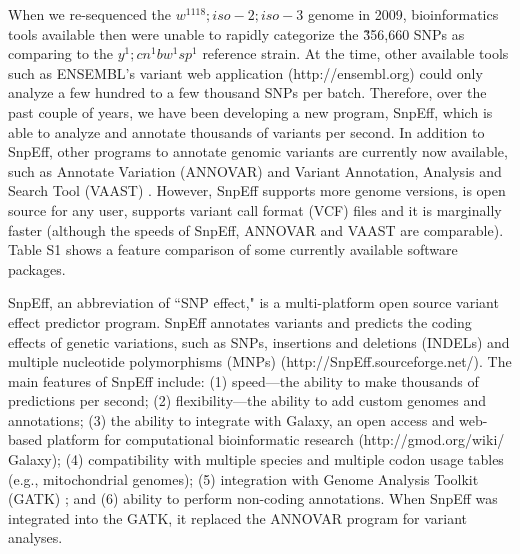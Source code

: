 When we re-sequenced the $w^{1118} ; iso-2; iso-3$ genome in 2009, \cite{platts2009massively} bioinformatics tools available then were unable to rapidly categorize the \~356,660 SNPs as comparing to the $y^1 ; cn^1 bw^1 sp^1$ reference strain. At the time, other available tools such as ENSEMBL’s variant web application (http://ensembl.org) could only analyze a few hundred to a few thousand SNPs per batch. Therefore, over the past couple of years, we have been developing a new program, SnpEff, which is able to analyze and annotate thousands of variants per second. In addition to SnpEff, other programs to annotate genomic variants are currently now available, such as Annotate Variation (ANNOVAR) \cite{wang2010annovar} and Variant Annotation, Analysis and Search Tool (VAAST) \cite{rope2011using}. However, SnpEff supports more genome versions, is open source for any user, supports variant call format (VCF) files and it is marginally faster (although the speeds of SnpEff, ANNOVAR and VAAST are comparable). Table S1 shows a feature comparison of some currently available software packages.

SnpEff, an abbreviation of ``SNP effect," is a multi-platform open source variant effect predictor program. SnpEff annotates variants and predicts the coding effects of genetic variations, such as SNPs, insertions and deletions (INDELs) and multiple nucleotide polymorphisms (MNPs) (http://SnpEff.sourceforge.net/).  The main features of SnpEff include: (1) speed—the ability to make thousands of predictions per second; (2) flexibility—the ability to add custom genomes and annotations; (3) the ability to integrate with Galaxy, an open access and web-based platform for computational bioinformatic research (http://gmod.org/wiki/ Galaxy); (4) compatibility with multiple species and multiple codon usage tables (e.g., mitochondrial genomes); (5) integration with Genome Analysis Toolkit (GATK) \cite{mckenna2010genome}; and (6) ability to perform non-coding annotations. When SnpEff was integrated into the GATK, it replaced the ANNOVAR program for variant analyses.

